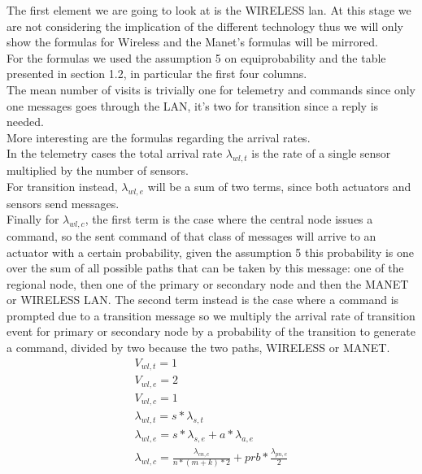 \documentclass[11pt]{article}
\begin{document}
The first element we are going to look at is the WIRELESS lan. At this stage we are not considering the implication of the different technology thus we will only show the formulas for Wireless and the Manet's formulas will be mirrored.\\
For the formulas we used the assumption 5 on equiprobability and the table presented in section 1.2, in particular the first four columns.\\
The mean number of visits is trivially one for telemetry and commands since only one messages goes through the LAN, it's two for transition since a reply is needed.\\
More interesting are the formulas regarding the arrival rates.\\
In the telemetry cases the total arrival rate $\lambda_{wl, t}$ is the rate of a single sensor multiplied by the number of sensors.\\
For transition instead, $\lambda_{wl, e}$ will be a sum of two terms, since both actuators and sensors send messages.\\
Finally for $\lambda_{wl, c}$, the first term is the case where the central node issues a command, so the sent command of that class of messages will arrive to an actuator with a certain probability, given the assumption 5 this probability is one over the sum of all possible paths that can be taken by this message: one of the regional node, then one of the primary or secondary node and then the MANET or WIRELESS LAN. The second term instead is the case where a command is prompted due to a transition message so we multiply the arrival rate of transition event for primary or secondary node by a probability of the transition to generate a command, divided by two because the two paths, WIRELESS or MANET.\\
\begin{equation}
    \begin{array}{l}
        V_{wl, t} = 1 \\
        V_{wl, e} = 2 \\ %
        V_{wl,c} = 1 \\
        \lambda_{wl, t} = s*\lambda_{s, t} \\
        \lambda_{wl, e} = s*\lambda_{s, e} + a*\lambda_{a, e} \\
        \lambda_{wl, c} = \frac{\lambda_{cn, c}}{n*(m+k)*2} + prb * \frac{\lambda_{pn, e}}{2}  \\\
    \end{array}
\end{equation}
\end{document}
